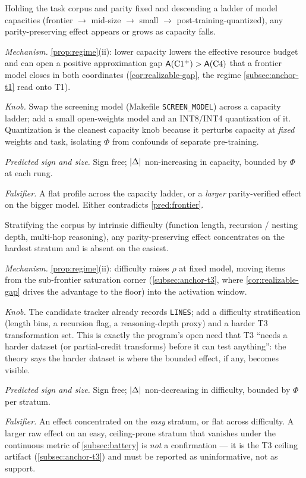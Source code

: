 \begin{prediction}
\label{pred:capacity}
Holding the task corpus and parity fixed and descending a ladder of model
capacities (frontier $\to$ mid-size $\to$ small $\to$ post-training-quantized),
any parity-preserving effect appears or grows as capacity falls.\par
\emph{Mechanism.} \cref{prop:regime}(ii): lower capacity lowers the effective
resource budget and can open a positive approximation gap
$\mathsf{A}(\mathrm{C1^{+}})>\mathsf{A}(\mathrm{C}4)$ that a frontier model closes in
both coordinates (\cref{cor:realizable-gap}, the regime
\cref{subsec:anchor-t1} read onto T1).\par
\emph{Knob.} Swap the screening model (Makefile \texttt{SCREEN\_MODEL}) across a
capacity ladder; add a small open-weights model and an INT8/INT4 quantization of
it. Quantization is the cleanest capacity knob because it perturbs capacity at
\emph{fixed} weights and task, isolating $\Phi$ from confounds of separate
pre-training.\par
\emph{Predicted sign and size.} Sign free; $|\Delta|$ non-increasing in
capacity, bounded by $\Phi$ at each rung.\par
\emph{Falsifier.} A flat profile across the capacity ladder, or a \emph{larger}
parity-verified effect on the bigger model. Either contradicts \cref{pred:frontier}.
\end{prediction}

\begin{prediction}
\label{pred:difficulty}
Stratifying the corpus by intrinsic difficulty (function length, recursion /
nesting depth, multi-hop reasoning), any parity-preserving effect concentrates on
the hardest stratum and is absent on the easiest.\par
\emph{Mechanism.} \cref{prop:regime}(ii): difficulty raises $\rho$ at fixed
model, moving items from the sub-frontier saturation corner
(\cref{subsec:anchor-t3}, where \cref{cor:realizable-gap} drives the advantage to
the floor) into the activation window.\par
\emph{Knob.} The candidate tracker already records \texttt{LINES}; add a
difficulty stratification (length bins, a recursion flag, a reasoning-depth
proxy) and a harder T3 transformation set. This is exactly the program's open
need that T3 ``needs a harder dataset (or partial-credit transforms) before it
can test anything'': the theory says the
harder dataset is where the bounded effect, if any, becomes visible.\par
\emph{Predicted sign and size.} Sign free; $|\Delta|$ non-decreasing in
difficulty, bounded by $\Phi$ per stratum.\par
\emph{Falsifier.} An effect concentrated on the \emph{easy} stratum, or flat
across difficulty. A larger raw effect on an easy, ceiling-prone stratum that
vanishes under the continuous metric of \cref{subsec:battery} is \emph{not} a
confirmation --- it is the T3 ceiling artifact (\cref{subsec:anchor-t3}) and
must be reported as uninformative, not as support.
\end{prediction}

